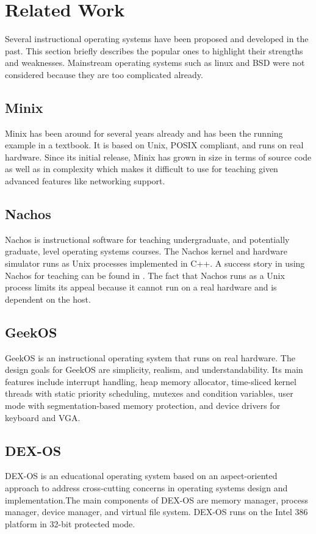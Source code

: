 \documentclass{acm_proc_article-sp}
\begin{document}
\section{Related Work}
Several instructional operating systems have been proposed and developed in 
the past\cite{anderson:survey}. This section briefly describes the popular ones to highlight
their strengths and weaknesses. Mainstream operating systems such as linux and
BSD were not considered because they are too complicated already.

\subsection{Minix}
Minix\cite{tanenbaum:minix} has been around for several years already and has 
been the running example in a textbook\cite{tanenbaum:osdai}. It is based
on Unix, POSIX compliant, and runs on real hardware. Since its initial release,
Minix has grown in size in terms of source code as well as in complexity 
which makes it difficult to use for teaching given advanced features like 
networking support.

\subsection{Nachos}
Nachos\cite{christopher:nachos} is instructional software for teaching 
undergraduate, and potentially graduate, level operating systems courses.
The Nachos kernel and hardware simulator runs as Unix processes implemented
in C++. A success story in using Nachos for teaching can be found in 
\cite{gary:nachos}. The fact that Nachos runs as a Unix process limits 
its appeal because it cannot run on a real hardware and is dependent on the
host.

\subsection{GeekOS}
GeekOS\cite{hovemeyer:geekos} is an instructional operating system that
runs on real hardware. The design goals for GeekOS are simplicity, realism,
and understandability. Its main features include interrupt handling, 
heap memory allocator, time-sliced kernel threads with static priority
scheduling, mutexes and condition variables, user mode with segmentation-based
memory protection, and device drivers for keyboard and VGA.


\subsection{DEX-OS}
DEX-OS\cite{dayo:dexos,dexos:site} is an educational operating system based on
an aspect-oriented approach to address cross-cutting concerns in operating 
systems design and implementation.The main components of DEX-OS are memory 
manager, process manager, device manager, and virtual file system. DEX-OS runs
on the Intel 386 platform in 32-bit protected mode.
\end{document}
